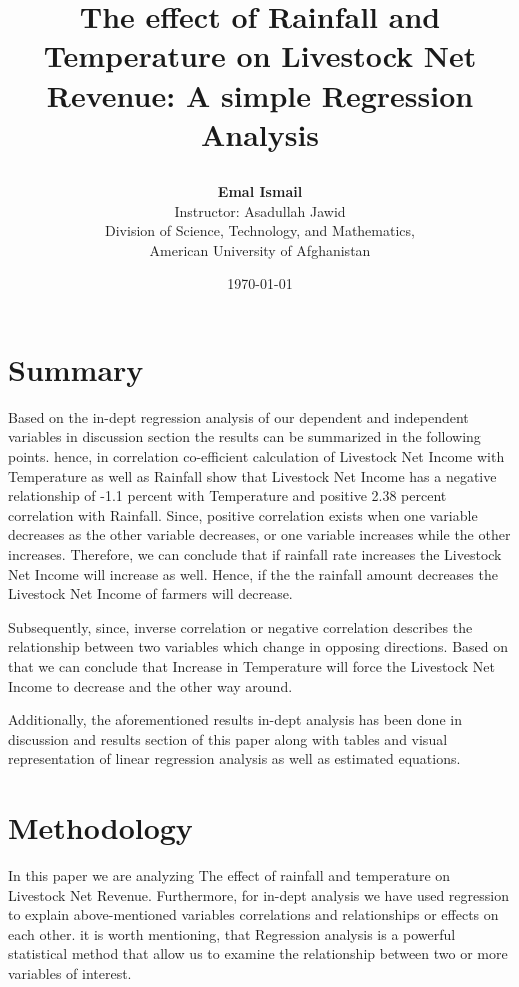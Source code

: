 \documentclass[12pt, a4]{article}
\title{\begin{center}
The effect of Rainfall and Temperature on Livestock Net Revenue: A simple Regression Analysis
\end{center}}
\author{
\textbf{Emal Ismail}\\
\vspace{3mm}
Instructor: Asadullah Jawid\\
\vspace{3mm}
Division of Science, Technology, and Mathematics, \\
American University of Afghanistan
}
\date{\today}
\begin{document}
\maketitle

\newpage
\tableofcontents

\newpage


\section{Summary}

Based on the in-dept regression analysis of our dependent and independent variables in discussion section the results can be summarized in the following points. hence, in correlation co-efficient calculation of Livestock Net Income with Temperature as well as Rainfall show that Livestock Net Income has a negative relationship of -1.1 percent with Temperature and positive 2.38 percent correlation with Rainfall.
Since,  positive correlation exists when one variable decreases as the other variable decreases, or one variable increases while the other increases. Therefore, we can conclude that if rainfall rate increases the Livestock Net Income will increase as well. Hence, if the the rainfall amount decreases the Livestock Net Income of farmers will decrease. 

\vspace{0.6\baselineskip} %

Subsequently, since, inverse correlation or negative correlation describes the relationship between two variables which change in opposing directions. Based on that we can conclude that Increase in Temperature will force the Livestock Net Income to decrease and the other way around.

Additionally, the aforementioned results in-dept analysis has been done in discussion and results section of this paper along with tables and visual representation of linear regression analysis as well as estimated equations.

\section{Methodology}
In this paper we are analyzing The effect of rainfall and temperature on Livestock Net Revenue. Furthermore, for in-dept analysis we have used regression to explain above-mentioned variables correlations and relationships or effects on each other. it is worth mentioning, that Regression analysis is a powerful statistical method that allow us to examine the relationship between two or more variables of interest. 
\end{document}
